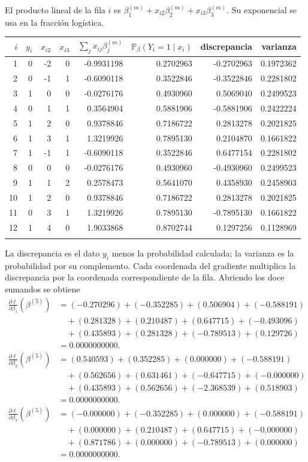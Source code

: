 \documentclass[11pt,a4paper]{article}
\newcommand{\Prob}{\mathbb P}
\begin{document}
El producto lineal de la fila \(i\) es
\(\beta_1^{(m)}+x_{i2}\beta_2^{(m)}+x_{i3}\beta_3^{(m)}\).
Su exponencial se usa en la fracción logística.
\begin{center}\scriptsize
\begin{tabular}{rrrrrrrr}\toprule
\(i\)&\(y_i\)&\(x_{i2}\)&\(x_{i3}\)&\(\sum_jx_{ij}\beta_j^{(m)}\)&\(\Prob_\beta(Y_i=1\mid x_i)\)&discrepancia&varianza\\\midrule
1&0&-2&0&-0.9931198&0.2702963&-0.2702963&0.1972362\\
2&0&-1&1&-0.6090118&0.3522846&-0.3522846&0.2281802\\
3&1&0&0&-0.0276176&0.4930960&0.5069040&0.2499523\\
4&0&1&1&0.3564904&0.5881906&-0.5881906&0.2422224\\
5&1&2&0&0.9378846&0.7186722&0.2813278&0.2021825\\
6&1&3&1&1.3219926&0.7895130&0.2104870&0.1661822\\
7&1&-1&1&-0.6090118&0.3522846&0.6477154&0.2281802\\
8&0&0&0&-0.0276176&0.4930960&-0.4930960&0.2499523\\
9&1&1&2&0.2578473&0.5641070&0.4358930&0.2458903\\
10&1&2&0&0.9378846&0.7186722&0.2813278&0.2021825\\
11&0&3&1&1.3219926&0.7895130&-0.7895130&0.1661822\\
12&1&4&0&1.9033868&0.8702744&0.1297256&0.1128969\\
\\\bottomrule\end{tabular}\end{center}
La discrepancia es el dato \(y_i\) menos la probabilidad
calculada; la varianza es la probabilidad por su complemento.
Cada coordenada del gradiente multiplica la discrepancia por
la coordenada correspondiente de la fila. Abriendo los doce
sumandos se obtiene
\[
\begin{aligned}
\frac{\partial\ell}{\partial\beta_1}(\beta^{(5)})&=(-0.270296)+(-0.352285)+(0.506904)+(-0.588191)\\&\quad+(0.281328)+(0.210487)+(0.647715)+(-0.493096)\\&\quad+(0.435893)+(0.281328)+(-0.789513)+(0.129726)\\&=0.0000000000.\end{aligned}
\]
\[
\begin{aligned}
\frac{\partial\ell}{\partial\beta_2}(\beta^{(5)})&=(0.540593)+(0.352285)+(0.000000)+(-0.588191)\\&\quad+(0.562656)+(0.631461)+(-0.647715)+(-0.000000)\\&\quad+(0.435893)+(0.562656)+(-2.368539)+(0.518903)\\&=0.0000000000.\end{aligned}
\]
\[
\begin{aligned}
\frac{\partial\ell}{\partial\beta_3}(\beta^{(5)})&=(-0.000000)+(-0.352285)+(0.000000)+(-0.588191)\\&\quad+(0.000000)+(0.210487)+(0.647715)+(-0.000000)\\&\quad+(0.871786)+(0.000000)+(-0.789513)+(0.000000)\\&=0.0000000000.\end{aligned}
\]
\end{document}
